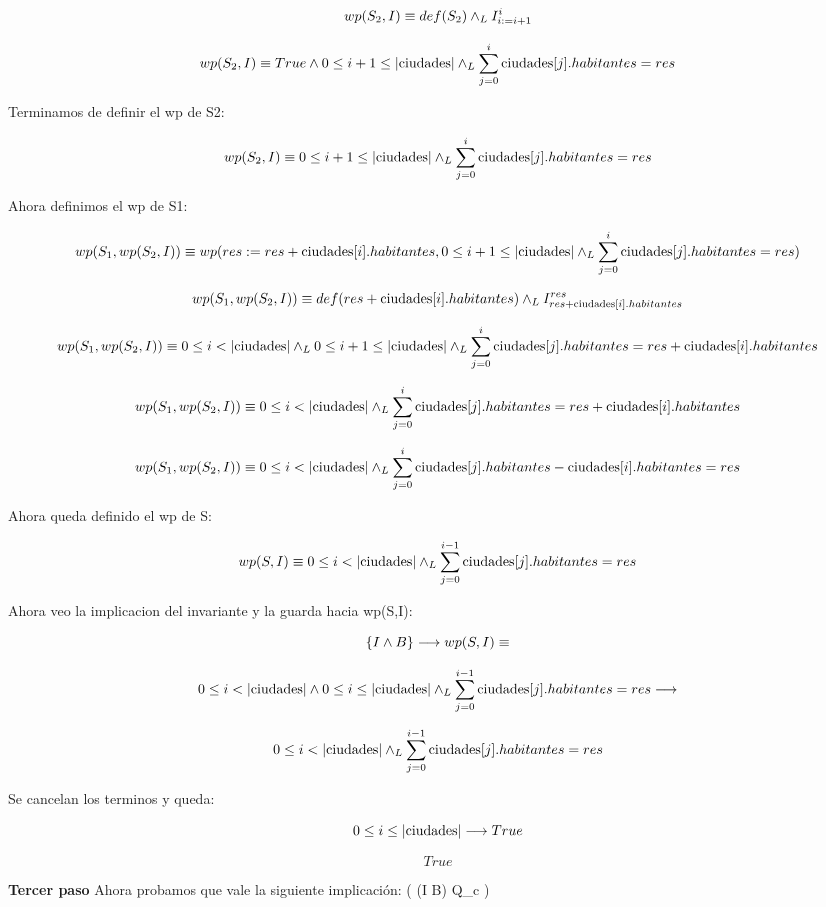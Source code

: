 \documentclass[10pt,a4paper]{article}
\begin{document}
\[
wp(S_2, I) \equiv def(S_2) \land _L I_{i := i+1}^{i}
\]

\[
wp(S_2, I) \equiv True \land 0 \leq i+1 \leq |\text{ciudades}| \land _L \sum_{j=0}^{i} \text{ciudades}[j].habitantes = res
\]

Terminamos de definir el wp de S2:

\[
wp(S_2, I) \equiv 0 \leq i+1 \leq |\text{ciudades}| \land _L \sum_{j=0}^{i} \text{ciudades}[j].habitantes = res
\]

Ahora definimos el wp de S1:

\[
wp(S_1, wp(S_2, I)) \equiv wp(res := res + \text{ciudades}[i].habitantes, 0 \leq i+1 \leq |\text{ciudades}| \land _L \sum_{j=0}^{i} \text{ciudades}[j].habitantes = res)
\]

\[
wp(S_1, wp(S_2, I)) \equiv def(res + \text{ciudades}[i].habitantes) \land _L I_{res + \text{ciudades}[i].habitantes}^{res}
\]

\[
wp(S_1, wp(S_2, I)) \equiv 0 \leq i < |\text{ciudades}| \land _L 0 \leq i+1 \leq |\text{ciudades}| \land _L \sum_{j=0}^{i} \text{ciudades}[j].habitantes = res + \text{ciudades}[i].habitantes
\]

\[
wp(S_1, wp(S_2, I)) \equiv 0 \leq i < |\text{ciudades}| \land _L \sum_{j=0}^{i} \text{ciudades}[j].habitantes = res + \text{ciudades}[i].habitantes
\]

\[
wp(S_1, wp(S_2, I)) \equiv 0 \leq i < |\text{ciudades}| \land _L \sum_{j=0}^{i} \text{ciudades}[j].habitantes - \text{ciudades}[i].habitantes = res 
\]

Ahora queda definido el wp de S:

\[
wp(S, I) \equiv 0 \leq i < |\text{ciudades}| \land _L \sum_{j=0}^{i-1} \text{ciudades}[j].habitantes = res
\]

Ahora veo la implicacion del invariante y la guarda hacia wp(S,I):

\[
\{I \land B\} \longrightarrow wp(S, I) \equiv
\]

\[
 0 \leq i < |\text{ciudades}| \land 0 \leq i \leq |\text{ciudades}| \land _L \sum_{j=0}^{i-1} \text{ciudades}[j].habitantes = res \longrightarrow 
\]

\[
0 \leq i < |\text{ciudades}| \land _L \sum_{j=0}^{i-1} \text{ciudades}[j].habitantes = res
\]

Se cancelan los terminos y queda:

\[
0 \leq i \leq |\text{ciudades}| \longrightarrow True
\]

\[
True
\]

\newpage

\textbf{Tercer paso} Ahora probamos que vale la siguiente implicación:
( (I \land \neg B) \implica Q_c )
\end{document}
